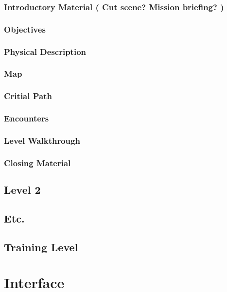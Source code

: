 \documentclass[article, 11pt]{article}
\begin{document}
\subsubsection{Introductory Material ( Cut scene? Mission briefing? )}
\label{sec:orgeb91eac}
\subsubsection{Objectives}
\label{sec:org1e7e4a0}
\subsubsection{Physical Description}
\label{sec:org7ec03e9}
\subsubsection{Map}
\label{sec:orga5f802e}
\subsubsection{Critial Path}
\label{sec:org1eb95f1}
\subsubsection{Encounters}
\label{sec:org94f24ef}
\subsubsection{Level Walkthrough}
\label{sec:org1bfed02}
\subsubsection{Closing Material}
\label{sec:org9ab08a9}
\subsection{Level 2}
\label{sec:orgd1fcf5e}
\subsection{Etc.}
\label{sec:orgb94df7a}
\subsection{Training Level}
\label{sec:org8045101}

\section{Interface}
\label{sec:org4723053}
\end{document}
